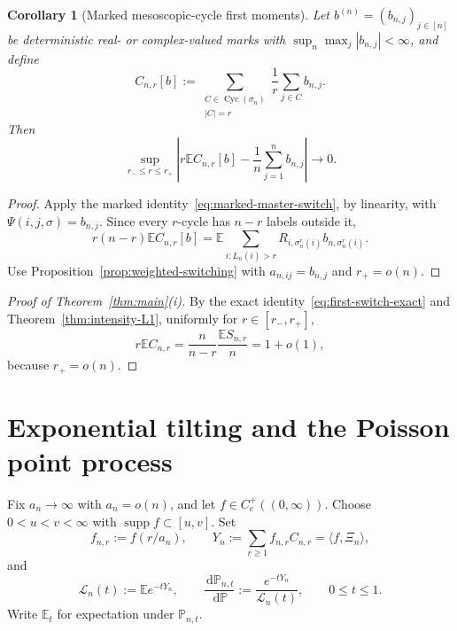 \documentclass[11pt]{article}
\newcommand{\E}{\mathbb E}
\newcommand{\Pp}{\mathbb P}
\newcommand{\1}{\mathbf 1}
\newcommand{\supp}{\operatorname{supp}}
\newcommand{\Cyc}{\operatorname{Cyc}}
\newcommand{\cL}{\mathcal L}
\newcommand{\dd}{\,\mathrm d}
\newtheorem{corollary}[theorem]{Corollary}
\theoremstyle{definition}
\theoremstyle{remark}
\begin{document}
\begin{corollary}[Marked mesoscopic-cycle first moments]
\label{cor:marked-cycle-moments}
Let $b^{(n)}=(b_{n,j})_{j\in[n]}$ be deterministic real- or
complex-valued marks with $\sup_n\max_j|b_{n,j}|<\infty$, and define
\begin{equation}\label{eq:marked-cycle-count}
 C_{n,r}[b]
 :=\sum_{\substack{C\in\Cyc(\sigma_n)\\|C|=r}}
   \frac1r\sum_{j\in C}b_{n,j}.
\end{equation}
Then
\begin{equation}\label{eq:marked-cycle-first-moment}
 \sup_{r_-\leq r\leq r_+}
 \left|
  r\E C_{n,r}[b]-\frac1n\sum_{j=1}^nb_{n,j}
 \right|
 \longrightarrow0.
\end{equation}
\end{corollary}

\begin{proof}
Apply the marked identity~\eqref{eq:marked-master-switch}, by linearity,
with $\Psi(i,j,\sigma)=b_{n,j}$.  Since every $r$-cycle has $n-r$
labels outside it,
\[
 r(n-r)\E C_{n,r}[b]
 =\E\sum_{i:L_n(i)>r}
   R_{i,\sigma_n^r(i)}b_{n,\sigma_n^r(i)}.
\]
Use Proposition~\ref{prop:weighted-switching} with
$a_{n,ij}=b_{n,j}$ and $r_+=o(n)$.
\end{proof}

\begin{proof}[Proof of Theorem~\ref{thm:main}(i)]
By the exact identity~\eqref{eq:first-switch-exact} and
Theorem~\ref{thm:intensity-L1}, uniformly for $r\in[r_-,r_+]$,
\[
  r\E C_{n,r}
  =\frac{n}{n-r}\frac{\E S_{n,r}}n
  =1+o(1),
\]
because $r_+=o(n)$.
\end{proof}

\section{Exponential tilting and the Poisson point process}
\label{sec:tilting}

Fix $a_n\to\infty$ with $a_n=o(n)$, and let
$f\in C_c^+((0,\infty))$.  Choose $0<u<v<\infty$ with
$\supp f\subset[u,v]$.  Set
\begin{equation}\label{eq:f-n-r}
  f_{n,r}:=f(r/a_n),
  \qquad
  Y_n:=\sum_{r\geq1}f_{n,r}C_{n,r}
      =\langle f,\Xi_n\rangle,
\end{equation}
and
\begin{equation}\label{eq:Laplace-tilt}
  \cL_n(t):=\E e^{-tY_n},
  \qquad
  \frac{\dd\Pp_{n,t}}{\dd\Pp}
  :=\frac{e^{-tY_n}}{\cL_n(t)},
  \qquad 0\leq t\leq1.
\end{equation}
Write $\E_t$ for expectation under $\Pp_{n,t}$.
\end{document}

